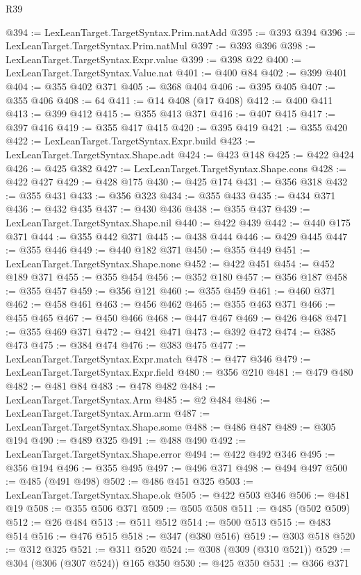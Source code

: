 \begin{lexlean}{R39}
\begin{coremodule}
@394 := LexLeanTarget.TargetSyntax.Prim.natAdd
@395 := @393 @394
@396 := LexLeanTarget.TargetSyntax.Prim.natMul
@397 := @393 @396
@398 := LexLeanTarget.TargetSyntax.Expr.value
@399 := @398 @22
@400 := LexLeanTarget.TargetSyntax.Value.nat
@401 := @400 @84
@402 := @399 @401
@404 := @355 @402 @371
@405 := @368 @404
@406 := @395 @405
@407 := @355 @406
@408 := 64
@411 := @14 @408 (@17 @408)
@412 := @400 @411
@413 := @399 @412
@415 := @355 @413 @371
@416 := @407 @415
@417 := @397 @416
@419 := @355 @417 @415
@420 := @395 @419
@421 := @355 @420
@422 := LexLeanTarget.TargetSyntax.Expr.build
@423 := LexLeanTarget.TargetSyntax.Shape.adt
@424 := @423 @148
@425 := @422 @424
@426 := @425 @382
@427 := LexLeanTarget.TargetSyntax.Shape.cons
@428 := @422 @427
@429 := @428 @175
@430 := @425 @174
@431 := @356 @318
@432 := @355 @431
@433 := @356 @323
@434 := @355 @433
@435 := @434 @371
@436 := @432 @435
@437 := @430 @436
@438 := @355 @437
@439 := LexLeanTarget.TargetSyntax.Shape.nil
@440 := @422 @439
@442 := @440 @175 @371
@444 := @355 @442 @371
@445 := @438 @444
@446 := @429 @445
@447 := @355 @446
@449 := @440 @182 @371
@450 := @355 @449
@451 := LexLeanTarget.TargetSyntax.Shape.none
@452 := @422 @451
@454 := @452 @189 @371
@455 := @355 @454
@456 := @352 @180
@457 := @356 @187
@458 := @355 @457
@459 := @356 @121
@460 := @355 @459
@461 := @460 @371
@462 := @458 @461
@463 := @456 @462
@465 := @355 @463 @371
@466 := @455 @465
@467 := @450 @466
@468 := @447 @467
@469 := @426 @468
@471 := @355 @469 @371
@472 := @421 @471
@473 := @392 @472
@474 := @385 @473
@475 := @384 @474
@476 := @383 @475
@477 := LexLeanTarget.TargetSyntax.Expr.match
@478 := @477 @346
@479 := LexLeanTarget.TargetSyntax.Expr.field
@480 := @356 @210
@481 := @479 @480
@482 := @481 @84
@483 := @478 @482
@484 := LexLeanTarget.TargetSyntax.Arm
@485 := @2 @484
@486 := LexLeanTarget.TargetSyntax.Arm.arm
@487 := LexLeanTarget.TargetSyntax.Shape.some
@488 := @486 @487
@489 := @305 @194
@490 := @489 @325
@491 := @488 @490
@492 := LexLeanTarget.TargetSyntax.Shape.error
@494 := @422 @492 @346
@495 := @356 @194
@496 := @355 @495
@497 := @496 @371
@498 := @494 @497
@500 := @485 (@491 @498)
@502 := @486 @451 @325
@503 := LexLeanTarget.TargetSyntax.Shape.ok
@505 := @422 @503 @346
@506 := @481 @19
@508 := @355 @506 @371
@509 := @505 @508
@511 := @485 (@502 @509)
@512 := @26 @484
@513 := @511 @512
@514 := @500 @513
@515 := @483 @514
@516 := @476 @515
@518 := @347 (@380 @516)
@519 := @303 @518
@520 := @312 @325
@521 := @311 @520
@524 := @308 (@309 (@310 @521))
@529 := @304 (@306 (@307 @524)) @165 @350
@530 := @425 @350
@531 := @366 @371

\end{coremodule}
\end{lexlean}
